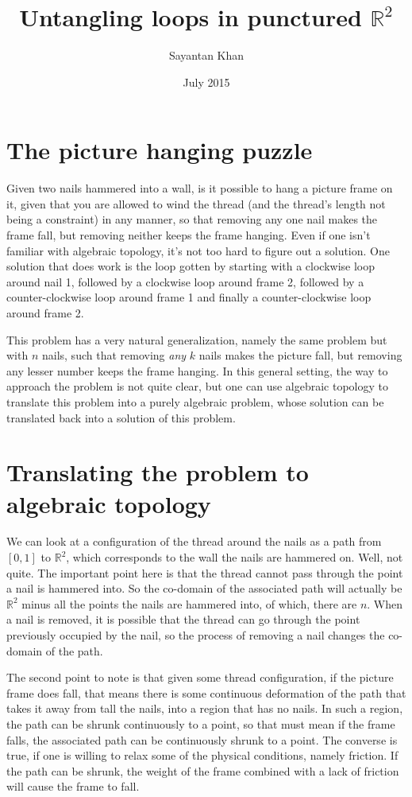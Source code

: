 \documentclass[12pt]{article}
\title{Untangling loops in punctured $\mathbb{R}^2$}
\author{Sayantan Khan}
\date{July 2015}
\theoremstyle{definition}
\begin{document}
\maketitle

\section{The picture hanging puzzle}
Given two nails hammered into a wall, is it possible to hang a picture frame on it, given that you are allowed to wind the thread (and the thread's length not being a constraint) in any manner, so that removing any one nail makes the frame fall, but removing neither keeps the frame hanging. Even if one isn't familiar with algebraic topology, it's not too hard to figure out a solution. One solution that does work is the loop gotten by starting with a clockwise loop around nail 1, followed by a clockwise loop around frame 2, followed by a counter-clockwise loop around frame 1 and finally a counter-clockwise loop around frame 2.

This problem has a very natural generalization, namely the same problem but with $n$ nails, such that removing \emph{any} $k$ nails makes the picture fall, but removing any lesser number keeps the frame hanging. In this general setting, the way to approach the problem is not quite clear, but one can use algebraic topology to translate this problem into a purely algebraic problem, whose solution can be translated back into a solution of this problem.

\section{Translating the problem to algebraic topology}
We can look at a configuration of the thread around the nails as a path from $[0,1]$ to $\mathbb{R}^2$, which corresponds to the wall the nails are hammered on. Well, not quite. The important point here is that the thread cannot pass through the point a nail is hammered into. So the co-domain of the associated path will actually be $\mathbb{R}^2$ minus all the points the nails are hammered into, of which, there are $n$. When a nail is removed, it is possible that the thread can go through the point previously occupied by the nail, so the process of removing a nail changes the co-domain of the path.

The second point to note is that given some thread configuration, if the picture frame does fall, that means there is some continuous deformation of the path that takes it away from tall the nails, into a region that has no nails. In such a region, the path can be shrunk continuously to a point, so that must mean if the frame falls, the associated path can be continuously shrunk to a point. The converse is true, if one is willing to relax some of the physical conditions, namely friction. If the path can be shrunk, the weight of the frame combined with a lack of friction will cause the frame to fall.
\end{document}

